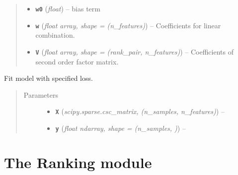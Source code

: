 \documentclass[letterpaper,10pt,english]{sphinxmanual}
\begin{document}
\begin{fulllineitems}
\begin{quote}
\begin{description}
\begin{itemize}
\item {} 
\textbf{\texttt{w0}} (\emph{float}) -- bias term

\item {} 
\textbf{\texttt{w}} (\emph{float \textbar{} array, shape = (n\_features)}) -- Coefficients for linear combination.

\item {} 
\textbf{\texttt{V}} (\emph{float \textbar{} array, shape = (rank\_pair, n\_features)}) -- Coefficients of second order factor matrix.

\end{itemize}

\end{description}\end{quote}

\begin{fulllineitems}
\label{api:fastFM.sgd.FMRegression.fit}
Fit model with specified loss.
\begin{quote}\begin{description}
\item[{Parameters}] \leavevmode\begin{itemize}
\item {} 
\textbf{\texttt{X}} (\emph{scipy.sparse.csc\_matrix, (n\_samples, n\_features)}) -- 

\item {} 
\textbf{\texttt{y}} (\emph{float \textbar{} ndarray, shape = (n\_samples, )}) -- 

\end{itemize}

\end{description}\end{quote}

\end{fulllineitems}


\end{fulllineitems}



\section{The Ranking module}
\label{api:module-fastFM.bpr}\label{api:the-ranking-module}
\end{document}
